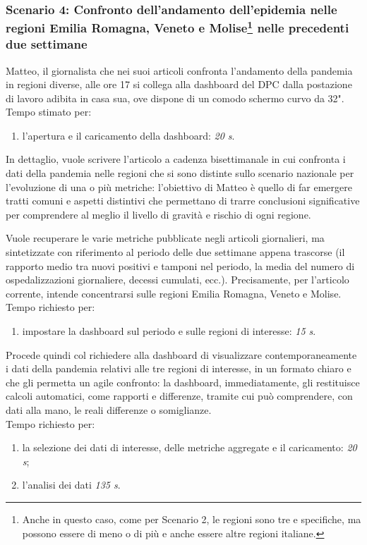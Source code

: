 \subsubsection[Scenario 4: Confronto dell'andamento dell'epidemia nelle regioni Emilia Romagna, Veneto e Molise nelle precedenti due settimane]{Scenario 4: Confronto dell'andamento dell'epidemia nelle regioni Emilia Romagna, Veneto e Molise\footnote{Anche in questo caso, come per Scenario 2, le regioni sono tre e specifiche, ma possono essere di meno o di più e anche essere altre regioni italiane.} nelle precedenti due settimane}
Matteo, il giornalista che nei suoi articoli confronta l'andamento della pandemia in regioni diverse, alle ore 17 si collega alla dashboard del DPC dalla postazione di lavoro adibita in casa sua, ove dispone di un comodo schermo curvo da 32".\\
Tempo stimato per:
\begin{enumerate}
    \item l'apertura e il caricamento della dashboard: \textit{20 s}.
\end{enumerate}

\noindent
In dettaglio, vuole scrivere l'articolo a cadenza bisettimanale in cui confronta i dati della pandemia nelle  regioni che si sono distinte sullo scenario nazionale per l'evoluzione di una o più metriche: l'obiettivo di Matteo è quello di far emergere tratti comuni e aspetti distintivi che permettano di trarre conclusioni significative per comprendere al meglio il livello di gravità e rischio di ogni regione.

Vuole recuperare le varie metriche pubblicate negli articoli giornalieri, ma sintetizzate con riferimento al periodo delle due settimane appena trascorse (il rapporto medio tra nuovi positivi e tamponi nel periodo, la media del numero di ospedalizzazioni giornaliere, decessi cumulati, ecc.).
Precisamente, per l'articolo corrente, intende concentrarsi sulle regioni Emilia Romagna, Veneto e Molise.\\
Tempo richiesto per:
\begin{enumerate}
    \item impostare la dashboard sul periodo e sulle regioni di interesse: \textit{15 s}.
\end{enumerate}

\noindent
Procede quindi col richiedere alla dashboard di visualizzare contemporaneamente i dati della pandemia relativi alle tre regioni di interesse, in un formato chiaro e che gli permetta un agile confronto: la dashboard, immediatamente, gli restituisce calcoli automatici, come rapporti e differenze, tramite cui può comprendere, con dati alla mano, le reali differenze o somiglianze.\\
Tempo richiesto per:
\begin{enumerate}
    \item la selezione dei dati di interesse, delle metriche aggregate e il caricamento: \textit{20 s};
    \item l'analisi dei dati \textit{135 s}.
\end{enumerate}

